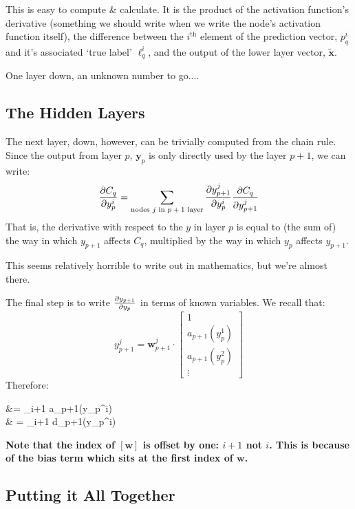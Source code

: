 \documentclass[a4paper,openany,11pt]{book}
\newcommand\cec[1]{\tilde{\vec{#1}}}
\renewcommand\vec[1]{\boldsymbol{\mathbf{#1}}}
\begin{document}
				
			This is easy to compute \& calculate. It is the product of the activation function's derivative (something we should write when we write the node's activation function itself), the difference between the $i^\text{th}$ element of the prediction vector, $p_q^i$ and it's associated `true label' $\ell_q^i$, and the output of the lower layer vector, $\cec{x}$. 
			
			
			One layer down, an unknown number to go....

			\subsection{The Hidden Layers}
			The next layer, down, however, can be trivially computed from the chain rule. Since the output from layer $p$, $\vec{y}_p$ is only directly used by the layer $p+1$, we can write:
			\begin{equation}
				\frac{\partial C_q}{\partial y_p^i} = \sum_{\text{nodes $j$ in $p+1$ layer}} \frac{\partial y_{p+1}^j}{\partial y_p^i} \frac{\partial C_q}{\partial y_{p+1}^j}
			\end{equation}
			That is, the derivative with respect to the $y$ in layer $p$ is equal to (the sum of) the way in which $y_{p+1}$ affects $C_q$, multiplied by the way in which $y_p$ affects $y_{p+1}$. 

			This seems relatively horrible to write out in mathematics, but we're almost there. 

			The final step is to write $\frac{\partial y_{p+1}}{\partial y_p}$ in terms of known variables. We recall that:
			\begin{equation}
				y^j_{p+1} = \vec{w}_{p+1}^j \cdot \begin{bmatrix} 1 \\ a_{p+1}(y_p^1) \\ a_{p+1}(y_p^2) \\ \vdots \end{bmatrix}
			\end{equation}
			Therefore:
			\begin{spalign}
				 &= \left[ \vec{w}_{p+1}^j \right]_{i+1}  a_{p+1}(y_p^i)
				\\
				& = \left[ \vec{w}_{p+1}^j \right]_{i+1} d_{p+1}(y_p^i)
			\end{spalign}
			\textbf{Note that the index of $[\vec{w}]$ is offset by one: $i+1$ not $i$. This is because of the bias term which sits at the first index of $\vec{w}$.}

			
			\subsection{Putting it All Together}
\end{document}
